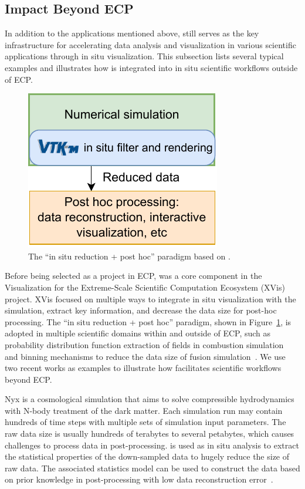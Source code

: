 \subsection{Impact Beyond ECP}


In addition to the applications mentioned above, \vtkm still serves as the key infrastructure for accelerating data analysis and visualization in various scientific applications through in situ visualization. This subsection lists several typical examples and illustrates how \vtkm is integrated into in situ scientific workflows outside of ECP.


\begin{figure}[htb]
  \centering
\includegraphics[width=0.60\linewidth]{figures/vtkm_insitu_posthoc}
\caption{The ``in situ reduction + post hoc'' paradigm based on \vtkm.}
\label{fig:vtkm_insitu_posthoc}
\end{figure}

Before being selected as a project in ECP, \vtkm was a core component in the Visualization for the Extreme-Scale Scientific Computation Ecosystem (XVis)~\cite{Moreland2019} project. 
XVis focused on multiple ways to integrate in situ visualization with the simulation, extract key information, and decrease the data size for post-hoc processing.
The ``in situ reduction + post hoc'' paradigm, shown in Figure~\ref{fig:vtkm_insitu_posthoc}, is adopted in multiple scientific domains within and outside of ECP, such as probability distribution function extraction of fields in combustion simulation~\cite{Ye2016} and binning mechanisms to reduce the data size of fusion simulation~\cite{Kress2018}. We use two recent works as examples to illustrate how \vtkm facilitates scientific workflows beyond ECP.


Nyx is a cosmological simulation that aims to solve compressible hydrodynamics with N-body treatment of the dark matter. Each simulation run may contain hundreds of time steps with multiple sets of simulation input parameters. The raw data size is usually hundreds of terabytes to several petabytes, which causes challenges to process data in post-processing. 
\vtkm is used as in situ analysis to extract the statistical properties of the down-sampled data to hugely reduce the size of raw data. The associated statistics model can be used to construct the data based on prior knowledge in post-processing with low data reconstruction error~\cite{Wang2019}.

